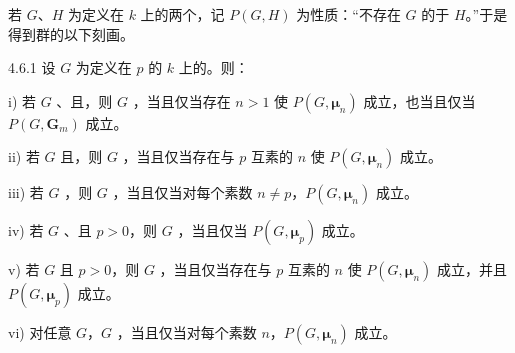 若 $G$、$H$ 为定义在 $k$ 上的两个，记 $P(G,H)$ 为性质：“不存在 $G$ 的于 $H$。”于是得到群的以下刻画。
\begin{SGAresult}{}{4.6.1}
设 $G$ 为定义在 $p$ 的 $k$ 上的。则：

i) 若 $G$ 、且，则 $G$ ，当且仅当存在 $n>1$ 使 $P(G,\boldsymbol\mu_n)$ 成立，也当且仅当 $P(G,\mathbf G_m)$ 成立。

ii) 若 $G$ 且，则 $G$ ，当且仅当存在与 $p$ 互素的 $n$ 使 $P(G,\boldsymbol\mu_n)$ 成立。

iii) 若 $G$ ，则 $G$ ，当且仅当对每个素数 $n\ne p$，$P(G,\boldsymbol\mu_n)$ 成立。

iv) 若 $G$ 、且 $p>0$，则 $G$ ，当且仅当 $P(G,\boldsymbol\mu_p)$ 成立。

v) 若 $G$ 且 $p>0$，则 $G$ ，当且仅当存在与 $p$ 互素的 $n$ 使 $P(G,\boldsymbol\mu_n)$ 成立，并且 $P(G,\boldsymbol\mu_p)$ 成立。

vi) 对任意 $G$，$G$ ，当且仅当对每个素数 $n$，$P(G,\boldsymbol\mu_n)$ 成立。
\end{SGAresult}
